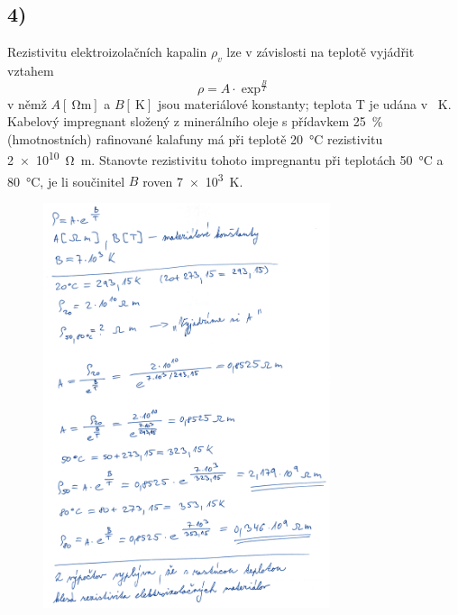 \newpage


\subsection*{4)}
Rezistivitu elektroizolačních kapalin $\rho_v$ lze v závislosti na teplotě vyjádřit vztahem
\begin{equation}
    \rho=A\cdot\exp^\frac{B}{T}
\end{equation}
v němž $A [\SI{}{\ohm\meter}]$ a $B [\SI{}{\kelvin}]$ jsou materiálové konstanty; teplota T je udána v \SI{}{\kelvin}. Kabelový impregnant složený z minerálního oleje s přídavkem \SI{25}{\percent} (hmotnostních) rafinované kalafuny má při teplotě \SI{20}{\degreeCelsius} rezistivitu \SI{2e10}{\ohm\meter}. Stanovte rezistivitu tohoto impregnantu při teplotách \SI{50}{\degreeCelsius} a \SI{80}{\degreeCelsius}, je li součinitel $B$ roven \SI{7e3}{\kelvin}.

\begin{figure}[h]
    \centering
    \includegraphics*[width=0.75\textwidth]{images/diel4.jpg}
\end{figure}

\newpage

